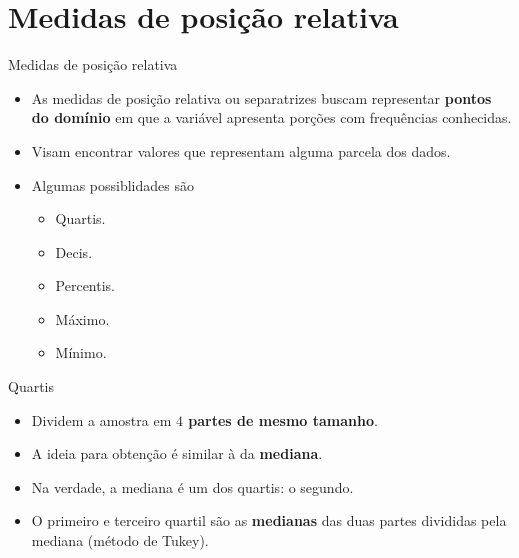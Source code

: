 \documentclass[
  ignorenonframetext,
  serif,
  professionalfont,
  usenames,
  dvipsnames,
  aspectratio = 169]{beamer}
\providecommand{\tightlist}{%
  \setlength{\itemsep}{0pt}\setlength{\parskip}{0pt}}
\renewcommand{\tightlist}{%
  \setlength{\itemsep}{0\baselineskip}
  \setlength{\parskip}{0.25\baselineskip}
}
\def\beginAHalfColumn{\begin{minipage}{0.49\textwidth}}%
\def\endColumns{\end{minipage}}%
\begin{document}
\section{Medidas de posição
relativa}\label{medidas-de-posiuxe7uxe3o-relativa}

\begin{frame}{Medidas de posição relativa}
\label{medidas-de-posiuxe7uxe3o-relativa-1}
\beginAHalfColumn

\begin{itemize}
\tightlist
\item
  As medidas de posição relativa ou separatrizes buscam representar
  \textbf{pontos do domínio} em que a variável apresenta porções com
  frequências conhecidas.
\end{itemize}

\vspace{0.3cm}

\begin{itemize}
\tightlist
\item
  Visam encontrar valores que representam alguma parcela dos dados.
\end{itemize}

\endColumns
\beginAHalfColumn

\begin{itemize}
\tightlist
\item
  Algumas possiblidades são

  \begin{itemize}
  \tightlist
  \item
    Quartis.
  \item
    Decis.
  \item
    Percentis.
  \item
    Máximo.
  \item
    Mínimo.
  \end{itemize}
\end{itemize}

\endColumns
\end{frame}

\begin{frame}{Quartis}
\label{quartis}
\begin{itemize}
\tightlist
\item
  Dividem a amostra em \textbf{$4$ partes de mesmo tamanho}.
\item
  A ideia para obtenção é similar à da \textbf{mediana}.
\item
  Na verdade, a mediana é um dos quartis: o segundo.
\item
  O primeiro e terceiro quartil são as \textbf{medianas} das duas partes
  divididas pela mediana (método de Tukey).
\end{itemize}
\end{frame}
\end{document}
